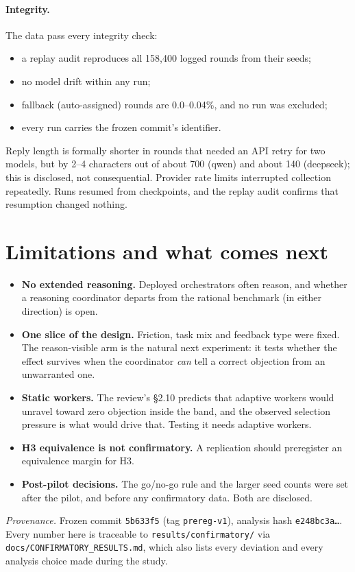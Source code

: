 \documentclass[11pt,a4paper]{article}
\begin{document}
\paragraph{Integrity.} The data pass every integrity check:
\begin{itemize}
  \item a replay audit reproduces all 158{,}400 logged rounds from their seeds;
  \item no model drift within any run;
  \item fallback (auto-assigned) rounds are 0.0--0.04\%, and no run was excluded;
  \item every run carries the frozen commit's identifier.
\end{itemize}
Reply length is formally shorter in rounds that needed an API retry for two models, but by 2--4 characters out of about 700 (qwen) and about 140 (deepseek); this is disclosed, not consequential. Provider rate limits interrupted collection repeatedly. Runs resumed from checkpoints, and the replay audit confirms that resumption changed nothing.

\section{Limitations and what comes next}

\begin{itemize}
  \item \textbf{No extended reasoning.} Deployed orchestrators often reason, and whether a reasoning coordinator departs from the rational benchmark (in either direction) is open.
  \item \textbf{One slice of the design.} Friction, task mix and feedback type were fixed. The reason-visible arm is the natural next experiment: it tests whether the effect survives when the coordinator \emph{can} tell a correct objection from an unwarranted one.
  \item \textbf{Static workers.} The review's \S2.10 predicts that adaptive workers would unravel toward zero objection inside the band, and the observed selection pressure is what would drive that. Testing it needs adaptive workers.
  \item \textbf{H3 equivalence is not confirmatory.} A replication should preregister an equivalence margin for H3.
  \item \textbf{Post-pilot decisions.} The go/no-go rule and the larger seed counts were set after the pilot, and before any confirmatory data. Both are disclosed.
\end{itemize}

\vspace{1em}
\noindent\small\textit{Provenance.} Frozen commit \texttt{5b633f5} (tag \texttt{prereg-v1}), analysis hash \texttt{e248bc3a\ldots}. Every number here is traceable to \texttt{results/confirmatory/} via \texttt{docs/CONFIRMATORY\_RESULTS.md}, which also lists every deviation and every analysis choice made during the study.
\end{document}
